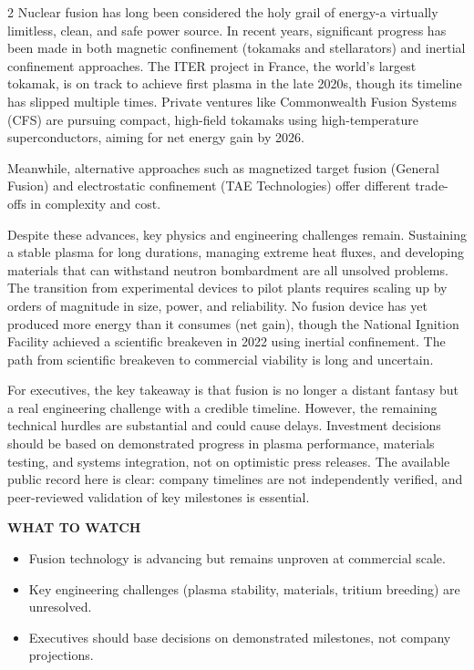 \documentclass[10pt,a4paper]{article}
\begin{document}
\begin{multicols}{2}
{\small Nuclear fusion has long been considered the holy grail of energy-a virtually limitless, clean, and safe power source. In recent years, significant progress has been made in both magnetic confinement (tokamaks and stellarators) and inertial confinement approaches. The ITER project in France, the world's largest tokamak, is on track to achieve first plasma in the late 2020s, though its timeline has slipped multiple times. Private ventures like Commonwealth Fusion Systems (CFS) are pursuing compact, high-field tokamaks using high-temperature superconductors, aiming for net energy gain by 2026.}\par
{\small Meanwhile, alternative approaches such as magnetized target fusion (General Fusion) and electrostatic confinement (TAE Technologies) offer different trade-offs in complexity and cost.}\par
{\small Despite these advances, key physics and engineering challenges remain. Sustaining a stable plasma for long durations, managing extreme heat fluxes, and developing materials that can withstand neutron bombardment are all unsolved problems. The transition from experimental devices to pilot plants requires scaling up by orders of magnitude in size, power, and reliability. No fusion device has yet produced more energy than it consumes (net gain), though the National Ignition Facility achieved a scientific breakeven in 2022 using inertial confinement. The path from scientific breakeven to commercial viability is long and uncertain.}\par
{\small For executives, the key takeaway is that fusion is no longer a distant fantasy but a real engineering challenge with a credible timeline. However, the remaining technical hurdles are substantial and could cause delays. Investment decisions should be based on demonstrated progress in plasma performance, materials testing, and systems integration, not on optimistic press releases. The available public record here is clear: company timelines are not independently verified, and peer-reviewed validation of key milestones is essential.}\par
\end{multicols}
\vspace{4pt}\noindent\begin{minipage}{\linewidth}
{\textcolor{BOGreen}{\scriptsize\bfseries WHAT TO WATCH}}\par\vspace{2pt}
{\footnotesize\begin{itemize}
\item Fusion technology is advancing but remains unproven at commercial scale.
\item Key engineering challenges (plasma stability, materials, tritium breeding) are unresolved.
\item Executives should base decisions on demonstrated milestones, not company projections.
\end{itemize}}
\end{minipage}
\label{chap:1:end}
\end{document}
